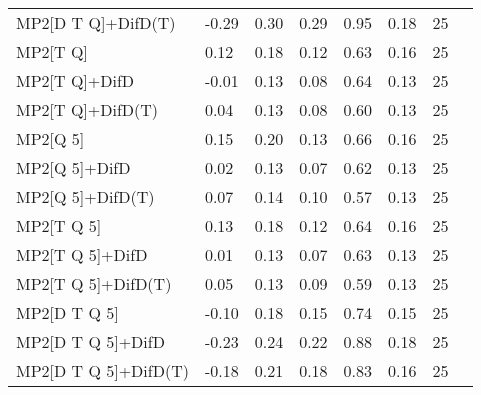 \begin{table}
\begin{tabular}{l l l l l l l l }
    MP2[D T Q]+DifD(T) & -0.29 & 0.30 & 0.29 & 0.95 & 0.18 & 25 \\ 
    MP2[T Q] & 0.12 & 0.18 & 0.12 & 0.63 & 0.16 & 25 \\ 
    MP2[T Q]+DifD & -0.01 & 0.13 & 0.08 & 0.64 & 0.13 & 25 \\ 
    MP2[T Q]+DifD(T) & 0.04 & 0.13 & 0.08 & 0.60 & 0.13 & 25 \\ 
    MP2[Q 5] & 0.15 & 0.20 & 0.13 & 0.66 & 0.16 & 25 \\ 
    MP2[Q 5]+DifD & 0.02 & 0.13 & 0.07 & 0.62 & 0.13 & 25 \\ 
    MP2[Q 5]+DifD(T) & 0.07 & 0.14 & 0.10 & 0.57 & 0.13 & 25 \\ 
    MP2[T Q 5] & 0.13 & 0.18 & 0.12 & 0.64 & 0.16 & 25 \\ 
    MP2[T Q 5]+DifD & 0.01 & 0.13 & 0.07 & 0.63 & 0.13 & 25 \\ 
    MP2[T Q 5]+DifD(T) & 0.05 & 0.13 & 0.09 & 0.59 & 0.13 & 25 \\ 
    MP2[D T Q 5] & -0.10 & 0.18 & 0.15 & 0.74 & 0.15 & 25 \\ 
    MP2[D T Q 5]+DifD & -0.23 & 0.24 & 0.22 & 0.88 & 0.18 & 25 \\ 
    MP2[D T Q 5]+DifD(T) & -0.18 & 0.21 & 0.18 & 0.83 & 0.16 & 25 \\ 
    \bottomrule
  \end{tabular}
\end{table}
